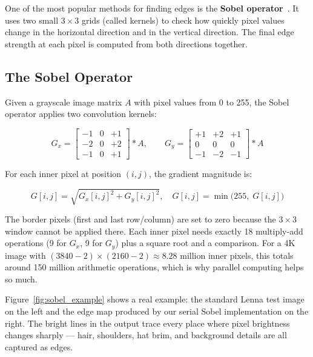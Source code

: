 \documentclass[12pt,a4paper]{article}
\begin{document}
One of the most popular methods for finding edges is the \textbf{Sobel
operator}~\cite{sobel1968}. It uses two small $3 \times 3$ grids (called
kernels) to check how quickly pixel values change in the horizontal direction
and in the vertical direction. The final edge strength at each pixel is
computed from both directions together.

\subsection{The Sobel Operator}

Given a grayscale image matrix $A$ with pixel values from 0 to 255, the
Sobel operator applies two convolution kernels:

\begin{equation}
G_x =
\begin{bmatrix}
-1 & 0 & +1 \\
-2 & 0 & +2 \\
-1 & 0 & +1
\end{bmatrix}
* A,
\qquad
G_y =
\begin{bmatrix}
+1 & +2 & +1 \\
 0 &  0 &  0 \\
-1 & -2 & -1
\end{bmatrix}
* A
\label{eq:sobel_kernels}
\end{equation}

For each inner pixel at position $(i,j)$, the gradient magnitude is:

\begin{equation}
G[i,j] = \sqrt{G_x[i,j]^2 + G_y[i,j]^2}, \quad
G[i,j] = \min\!\bigl(255,\; G[i,j]\bigr)
\label{eq:magnitude}
\end{equation}

The border pixels (first and last row/column) are set to zero because the
$3 \times 3$ window cannot be applied there. Each inner pixel needs exactly
18 multiply-add operations (9 for $G_x$, 9 for $G_y$) plus a square root and
a comparison. For a 4K image with $(3840-2)\times(2160-2) \approx 8.28$ million
inner pixels, this totals around 150 million arithmetic operations, which is
why parallel computing helps so much.

Figure~\ref{fig:sobel_example} shows a real example: the standard Lenna test
image on the left and the edge map produced by our serial Sobel implementation
on the right. The bright lines in the output trace every place where pixel
brightness changes sharply --- hair, shoulders, hat brim, and background
details are all captured as edges.
\end{document}
